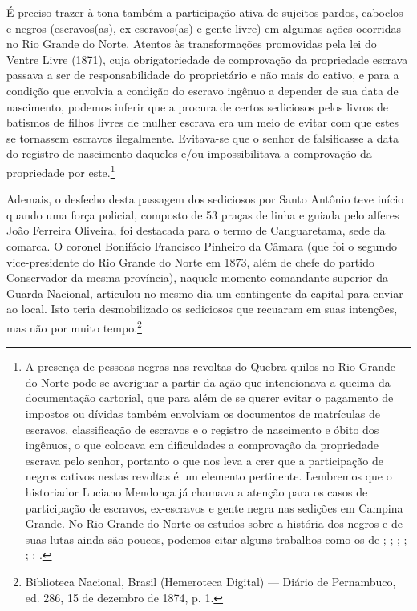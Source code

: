 \begin{refsection}
É preciso trazer à tona também a participação ativa de sujeitos pardos, caboclos e negros (escravos(as), ex-escravos(as) e gente livre) em algumas ações ocorridas no Rio Grande do Norte. Atentos às transformações promovidas pela lei do Ventre Livre (1871), cuja obrigatoriedade de comprovação da propriedade escrava passava a ser de responsabilidade do proprietário e não mais do cativo, e para a condição que envolvia a condição do escravo ingênuo a depender de sua data de nascimento, podemos inferir que a procura de certos sediciosos pelos livros de batismos de filhos livres de mulher escrava era um meio de evitar com que estes se tornassem escravos ilegalmente. Evitava-se que o senhor de falsificasse a data do registro de nascimento daqueles e/ou impossibilitava a comprovação da propriedade por este.\footnote{A presença de pessoas negras nas revoltas do Quebra-quilos no Rio Grande do Norte pode se averiguar a partir da ação que intencionava a queima da documentação cartorial, que para além de se querer evitar o pagamento de impostos ou dívidas também envolviam os documentos de matrículas de escravos, classificação de escravos e o registro de nascimento e óbito dos ingênuos, o que colocava em dificuldades a comprovação da propriedade escrava pelo senhor, portanto o que nos leva a crer que a participação de negros cativos nestas revoltas é um elemento pertinente. Lembremos que o historiador Luciano Mendonça já chamava a atenção para os casos de participação de escravos, ex-escravos e gente negra nas sedições em Campina Grande. No Rio Grande do Norte os estudos sobre a história dos negros e de suas lutas ainda são poucos, podemos citar alguns trabalhos como os de ; ; ; ; ; ; .}

Ademais, o desfecho desta passagem dos sediciosos por Santo Antônio teve início quando uma força policial, composto de 53 praças de linha e guiada pelo alferes João Ferreira Oliveira, foi destacada para o termo de Canguaretama, sede da comarca. O coronel Bonifácio Francisco Pinheiro da Câmara (que foi o segundo vice-presidente do Rio Grande do Norte em 1873, além de chefe do partido Conservador da mesma província), naquele momento comandante superior da Guarda Nacional, articulou no mesmo dia um contingente da capital para enviar ao local. Isto teria desmobilizado os sediciosos que recuaram em suas intenções, mas não por muito tempo.\footnote{Biblioteca Nacional, Brasil (Hemeroteca Digital) --- Diário de Pernambuco, ed. 286, 15 de dezembro de 1874, p. 1.}


\end{refsection}
